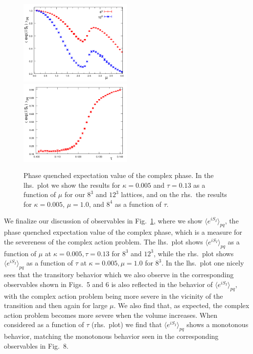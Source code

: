 \documentclass[a4paper,11pt]{article}
\begin{document}
\begin{figure}[t]
\begin{center}
\hspace*{-3mm}
{\includegraphics[width=0.5\textwidth]{phase_mu_run_12.pdf}} 
{\includegraphics[width=0.5\textwidth]{phase_tau_run.pdf}} 
\end{center}
\caption{Phase quenched expectation value of the complex phase. In the lhs.\ plot 
we show the results for $\kappa = 0.005$ and $\tau = 0.13$ as a function of $\mu$ 
for our $8^3$ and $12^3$ lattices, and on the rhs.\ the results for $\kappa = 0.005$, 
$\mu = 1.0$, and $8^4$ as a function of $\tau$.}
\label{fig:results_phase}
\end{figure}

We finalize our discussion of observables in Fig.~\ref{fig:results_phase}, where we show
$\langle e^{i S_I} \rangle_{pq}$, the phase quenched expectation value of the complex
phase, which is a measure for the severeness of the complex action problem. 
The lhs.\ plot shows $\langle e^{i S_I} \rangle_{pq}$ as a function of $\mu$ at $\kappa = 0.005, \tau = 0.13$ for 
$8^3$ and $12^3$, while the rhs.\ plot shows $\langle e^{i S_I} \rangle_{pq}$ as a function of $\tau$ at 
$\kappa = 0.005, \mu = 1.0$ for $8^3$. In the lhs.\ plot one nicely sees that the transitory behavior which we also 
observe in the corresponding observables shown in Figs.~5 and 6 is also reflected in the behavior of 
$\langle e^{i S_I} \rangle_{pq}$, with the complex action problem being more severe in the vicinity of the
transition and then again for large $\mu$. We also find that, as expected, the complex action problem becomes more
severe when the volume increases.  When considered as a function of $\tau$ (rhs.\ plot) we find that 
$\langle e^{i S_I} \rangle_{pq}$ shows a monotonous behavior, matching the monotonous behavior seen in the 
corresponding observables in Fig.~8.
\end{document}
